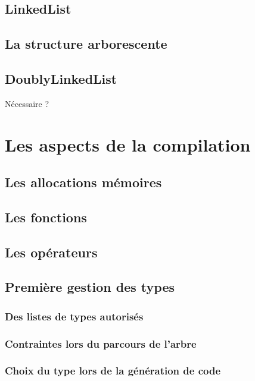 \documentclass[12pt]{article}
\begin{document}
\subsection{LinkedList}

\subsection{La structure arborescente}

\subsection{DoublyLinkedList}
Nécessaire ?

\section{Les aspects de la compilation}

\subsection{Les allocations mémoires}

\subsection{Les fonctions}

\subsection{Les opérateurs}

\subsection{Première gestion des types}

\subsubsection{Des listes de types autorisés}

\subsubsection{Contraintes lors du parcours de l'arbre}

\subsubsection{Choix du type lors de la génération de code}
\end{document}
